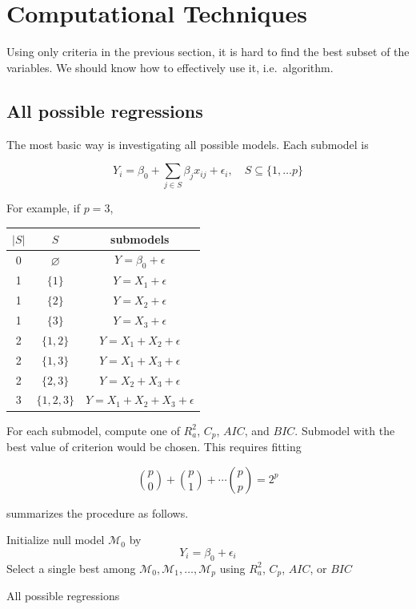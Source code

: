 \documentclass[]{book}
\theoremstyle{definition}
\theoremstyle{definition}
\theoremstyle{definition}
\theoremstyle{remark}
\begin{document}
\hypertarget{computational-techniques}{%
\section{Computational Techniques}\label{computational-techniques}}

Using only criteria in the previous section, it is hard to find the best subset of the variables. We should know how to effectively use it, i.e.~algorithm.

\hypertarget{all-possible-regressions}{%
\subsection{All possible regressions}\label{all-possible-regressions}}

The most basic way is investigating all possible models. Each submodel is

\begin{equation}
  Y_i = \beta_0 + \sum_{j \in S} \beta_j x_{ij} + \epsilon_i, \quad S \subseteq \{ 1, \ldots p \}
  \label{eq:bestsub}
\end{equation}

For example, if \(p = 3\),

\begin{longtable}[]{@{}ccc@{}}
\toprule
\(\lvert S \rvert\) & \(S\) & submodels\tabularnewline
\midrule
\endhead
0 & \(\varnothing\) & \(Y = \beta_0 + \epsilon\)\tabularnewline
1 & \(\{ 1 \}\) & \(Y = X_1 + \epsilon\)\tabularnewline
1 & \(\{ 2 \}\) & \(Y = X_2 + \epsilon\)\tabularnewline
1 & \(\{ 3 \}\) & \(Y = X_3 + \epsilon\)\tabularnewline
2 & \(\{ 1, 2 \}\) & \(Y = X_1 + X_2 + \epsilon\)\tabularnewline
2 & \(\{ 1, 3 \}\) & \(Y = X_1 + X_3 + \epsilon\)\tabularnewline
2 & \(\{ 2, 3 \}\) & \(Y = X_2 + X_3 + \epsilon\)\tabularnewline
3 & \(\{ 1, 2, 3 \}\) & \(Y = X_1 + X_2 + X_3 + \epsilon\)\tabularnewline
\bottomrule
\end{longtable}

For each submodel, compute one of \(R_a^2\), \(C_p\), \(AIC\), and \(BIC\). Submodel with the best value of criterion would be chosen. This requires fitting

\[\binom{p}{0} + \binom{p}{1} + \cdots \binom{p}{p} = 2^p\]

\citet{James:2013aa} summarizes the procedure as follows.

\begin{algorithm}[H] \label{alg:bestsubset}
  \SetAlgoLined
  Initialize null model $\mathcal{M}_0$ by $$Y_i = \beta_0 + \epsilon_i$$\;
  Select a single best among $\mathcal{M}_0, \mathcal{M}_1, \ldots, \mathcal{M}_p$ using $R_a^2$, $C_p$, $AIC$, or $BIC$\;
  \caption{All possible regressions}
\end{algorithm}
\end{document}
